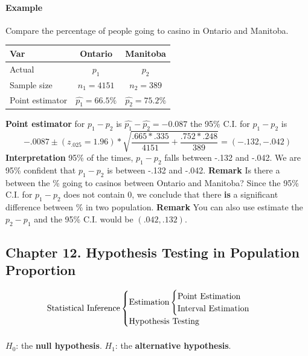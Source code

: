 \documentclass{article}
\begin{document}
		\paragraph{Example} Compare the percentage of people going to casino in Ontario and Manitoba.
			\begin{center}
				\begin{tabular}{l|cc}
				  Var & Ontario & Manitoba \\
				  \hline
				  Actual & $p_1$ & $p_2$ \\
				  Sample size & $n_1=4151$ & $n_2=389$ \\
				  Point estimator & $\hat{p_1}=66.5\%$ & $\hat{p_2}=75.2\%$
				\end{tabular}
			\end{center}
			\quad \textbf{Point estimator} for $p_1 - p_2$ is $\hat{p_1} - \hat{p_2} = -0.087$
			\newline the 95\% C.I. for $p_1 - p_2$ is
				\[
					-.0087 \pm (z_{.025}=1.96) * \sqrt{\frac{.665 * .335}{4151} + \frac{.752 * .248}{389}} = (-.132, -.042)
				\]
			\newline \textbf{Interpretation} 95\% of the times, $p_1 - p_2$ falls between -.132 and -.042. We are 95\% confident that $p_1 - p_2$ is between -.132 and -.042.
			\newline \textbf{Remark} Is there a  between the \% going to casinos between Ontario and Manitoba? Since the 95\% C.I. for $p_1 - p_2$ does not contain 0, we conclude that there \textbf{is} a significant difference between \% in two population.
			\newline \textbf{Remark} You can also use estimate the $p_2 - p_1$ and the 95\% C.I. would be $(.042, .132)$.
		
		\subsection{Chapter 12. Hypothesis Testing in Population Proportion}
		\[
			\text{{Statistical Inference}}
			\begin{cases}
				\text{{Estimation}}
					\begin{cases}	
						\text{{Point Estimation}} \\
						\text{{Interval Estimation}}
					\end{cases}\\
				\text{{Hypothesis Testing}}
			\end{cases}
		\]
		\paragraph{} $H_0$: the \textbf{null hypothesis}. $H_1$: the \textbf{alternative hypothesis}.
\end{document}
